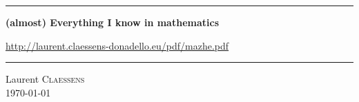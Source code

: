 
\thispagestyle{empty}
\begin{center}
  \begin{minipage}{15cm}
    \hrule\par
    \vspace{2mm}
    \begin{center}
    \Huge \bfseries (almost) Everything I know in mathematics \par
    \normalsize
    \url{http://laurent.claessens-donadello.eu/pdf/mazhe.pdf}
    \end{center}
    \hrule\par
  \end{minipage}
\end{center}

\vspace{2cm}

\begin{center}
    Laurent \textsc{Claessens}\\
    \today\\
    \texttt{\GitCommitHexsha}
\end{center}

\vfill

\LogoEtLicence
\clearpage


